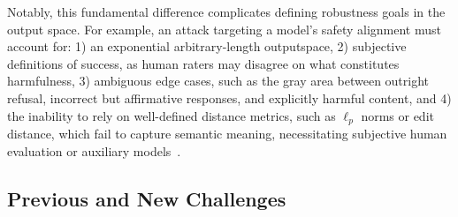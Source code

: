 
Notably, this fundamental difference complicates defining robustness goals in the output space. For example, an attack targeting a model's safety alignment must account for: 1) an exponential arbitrary-length outputspace, 2) subjective definitions of success, as human raters may disagree on what constitutes harmfulness, 3) ambiguous edge cases, such as the gray area between outright refusal, incorrect but affirmative responses, and explicitly harmful content, and 4) the inability to rely on well-defined distance metrics, such as $\ell_p$ norms or edit distance, which fail to capture semantic meaning, necessitating subjective human evaluation or auxiliary models~\cite{zou2023universal, mazeika2024harmbench}. 

\vspace{-5pt}
\subsection{Previous and New Challenges}\label{sec:pos-goals-challenges}


